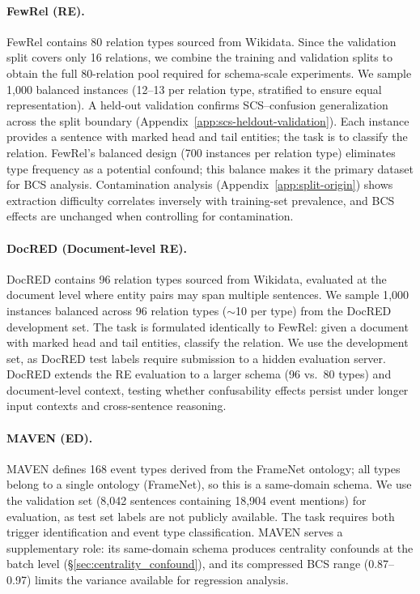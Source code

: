 \paragraph{FewRel (RE).}
FewRel \citep{fewrel-2018} contains 80 relation types sourced from Wikidata. Since the validation split covers only 16 relations, we combine the training and validation splits to obtain the full 80-relation pool required for schema-scale experiments. We sample 1{,}000 balanced instances (12--13 per relation type, stratified to ensure equal representation). A held-out validation confirms SCS--confusion generalization across the split boundary (Appendix~\ref{app:scs-heldout-validation}). Each instance provides a sentence with marked head and tail entities; the task is to classify the relation. FewRel's balanced design (700 instances per relation type) eliminates type frequency as a potential confound; this balance makes it the primary dataset for BCS analysis. Contamination analysis (Appendix~\ref{app:split-origin}) shows extraction difficulty correlates inversely with training-set prevalence, and BCS effects are unchanged when controlling for contamination.

\paragraph{DocRED (Document-level RE).}
DocRED \citep{docred-2019} contains 96 relation types sourced from Wikidata, evaluated at the document level where entity pairs may span multiple sentences. We sample 1{,}000 instances balanced across 96 relation types ($\sim$10 per type) from the DocRED development set. The task is formulated identically to FewRel: given a document with marked head and tail entities, classify the relation. We use the development set, as DocRED test labels require submission to a hidden evaluation server. DocRED extends the RE evaluation to a larger schema (96 vs.\ 80 types) and document-level context, testing whether confusability effects persist under longer input contexts and cross-sentence reasoning.

\paragraph{MAVEN (ED).}
MAVEN \citep{maven-2020} defines 168 event types derived from the FrameNet ontology; all types belong to a single ontology (FrameNet), so this is a same-domain schema. We use the validation set (8{,}042 sentences containing 18{,}904 event mentions) for evaluation, as test set labels are not publicly available. The task requires both trigger identification and event type classification. MAVEN serves a supplementary role: its same-domain schema produces centrality confounds at the batch level (\S\ref{sec:centrality_confound}), and its compressed BCS range (0.87--0.97) limits the variance available for regression analysis.

